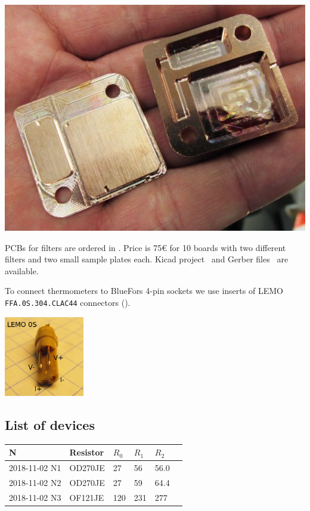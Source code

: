 \documentclass[a4paper]{article}
\begin{document}
\begin{center}
\includegraphics[width=\linewidth]{img/box.jpg}
\end{center}

PCBs for filters are ordered in \MultiCB. Price
is 75\euro{} for 10 boards with two different filters and two small
sample plates each. Kicad project~\cite{filterpcb-kicad} and Gerber
files~\cite{filterpcb-gerber} are available.

To connect thermometers to BlueFors 4-pin sockets we use inserts
of LEMO {\tt FFA.0S.304.CLAC44} connectors ().

\begin{center}
\includegraphics[width=3.5cm]{img/conn.jpg}
\end{center}

\subsection*{List of devices}

\noindent
\begin{tabular}{|ll lll l|}\hline
N& Resistor& $R_0$ & $R_1$ & $R_2$ & \\
\hline
2018-11-02 N1&OD270JE& 27  & 56  & 56.0&\\
2018-11-02 N2&OD270JE& 27  & 59  & 64.4&\\
2018-11-02 N3&OF121JE& 120 & 231 & 277&\\
\hline
\end{tabular}
\medskip
\end{document}
